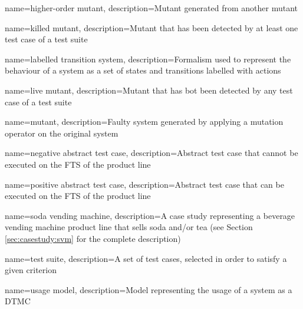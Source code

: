 {
    name=higher-order mutant,
    description={Mutant generated from another mutant}
}

{
    name=killed mutant,
    description={Mutant that has been detected by at least one test case of a test suite}
}

{
    name=labelled transition system,
    description={Formalism used to represent the behaviour of a system as a set of states and transitions labelled with actions}
}

{
    name=live mutant,
    description={Mutant that has bot been detected by any test case of a test suite}
}

{
    name=mutant,
    description={Faulty system generated by applying a mutation operator on the original system}
}

{
    name=negative abstract test case,
    description={Abstract test case that cannot be executed on the FTS of the product line}
}

{
    name=positive abstract test case,
    description={Abstract test case that can be executed on the FTS of the product line}
}

{
    name=soda vending machine,
    description={A case study representing a beverage vending machine product line that sells soda and/or tea (see Section \ref{sec:casestudy:svm} for the complete description)}
}

{
    name=test suite,
    description={A set of test cases, selected in order to satisfy a given criterion}
}

{
    name=usage model,
    description={Model representing the usage of a system as a \acrfull{DTMC}}
}







